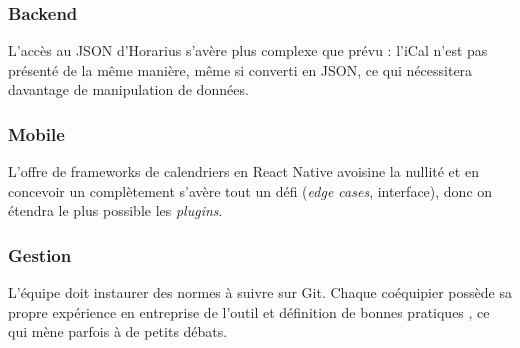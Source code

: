 \subsubsection{Backend}
L'accès au JSON d'Horarius s'avère plus complexe que prévu : l'iCal n'est pas présenté de la même manière, même si converti en JSON, ce qui nécessitera davantage de manipulation de données.

\subsubsection{Mobile}
L'offre de frameworks de calendriers en React Native avoisine la nullité et en concevoir un complètement s'avère tout un défi (\emph{edge cases}, interface), donc on \og étendra \fg{} le plus possible les \emph{plugins}.

\subsubsection{Gestion}
L'équipe doit instaurer des normes à suivre sur Git. Chaque coéquipier possède sa propre expérience en entreprise de l'outil et définition de \og bonnes pratiques \fg, ce qui mène parfois à de petits débats.